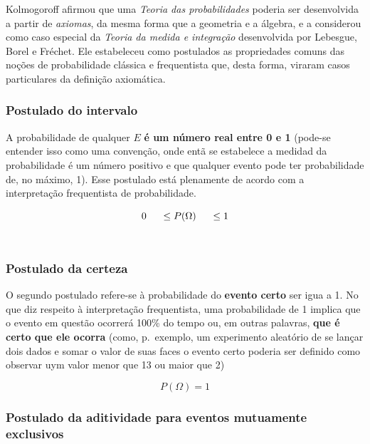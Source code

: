 \documentclass[
]{book}
\begin{document}
Kolmogoroff afirmou que uma \emph{Teoria das probabilidades} poderia ser desenvolvida a partir de \emph{axiomas}, da
mesma forma que a geometria e a álgebra, e a considerou como caso especial da \emph{Teoria da medida e integração} desenvolvida por Lebesgue, Borel e Fréchet. Ele estabeleceu como postulados as propriedades comuns das noções de probabilidade clássica e frequentista que, desta forma, viraram casos particulares da definição axiomática.

\hfill\break

\hypertarget{postulado-do-intervalo}{%
\subsubsection{Postulado do intervalo}\label{postulado-do-intervalo}}

A probabilidade de qualquer \(E\) \textbf{é um número real entre 0 e 1} (pode-se entender isso como uma convenção, onde entã se estabelece a medidad da probabilidade é um número positivo e que qualquer evento pode ter probabilidade de, no máximo, 1). Esse postulado está plenamente de acordo com a interpretação frequentista de probabilidade.

\[
0 \hspace{0.5cm} \leq P(\Omega) \hspace{0.5cm} \leq 1
\]\\

\hypertarget{postulado-da-certeza}{%
\subsubsection{Postulado da certeza}\label{postulado-da-certeza}}

O segundo postulado refere-se à probabilidade do \textbf{evento certo} ser igua a 1. No que diz respeito à interpretação frequentista, uma probabilidade de 1 implica que o evento em questão ocorrerá 100\% do tempo ou, em outras palavras, \textbf{que é certo que ele ocorra} (como, p.~exemplo, um experimento aleatório de se lançar dois dados e somar o valor de suas faces o evento certo poderia ser definido como observar uym valor menor que 13 ou maior que 2)

\[
P(\Omega) = 1
\]

\hfill\break

\hypertarget{postulado-da-aditividade-para-eventos-mutuamente-exclusivos}{%
\subsubsection{Postulado da aditividade para eventos mutuamente exclusivos}\label{postulado-da-aditividade-para-eventos-mutuamente-exclusivos}}
\end{document}
